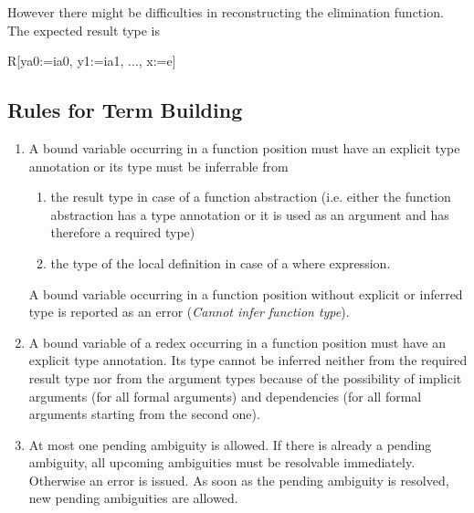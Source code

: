 However there might be difficulties in reconstructing the elimination function.
The expected result type is
\begin{alba}
    R[ya0:=ia0, y1:=ia1, ..., x:=e]
\end{alba}








\vskip 5mm
\subsection{Rules for Term Building}

\begin{enumerate}

\item A bound variable occurring in a function position must have an explicit
type annotation or its type must be inferrable from

    \begin{enumerate}

    \item the result type in case of a function abstraction (i.e. either the
    function abstraction has a type annotation or it is used as an argument and
    has therefore a required type)

    \item the type of the local definition in case of a where expression.
    \end{enumerate}

A bound variable occurring in a function position without explicit or inferred
type is reported as an error ({\em Cannot infer function type}).

\item A bound variable of a redex occurring in a function position must have an
explicit type annotation. Its type cannot be inferred neither from the required
result type nor from the argument types because of the possibility of implicit
arguments (for all formal arguments) and dependencies (for all formal arguments
starting from the second one).

\item At most one pending ambiguity is allowed. If there is already a pending
ambiguity, all upcoming ambiguities must be resolvable immediately. Otherwise an
error is issued. As soon as the pending ambiguity is resolved, new pending
ambiguities are allowed.

\end{enumerate}





